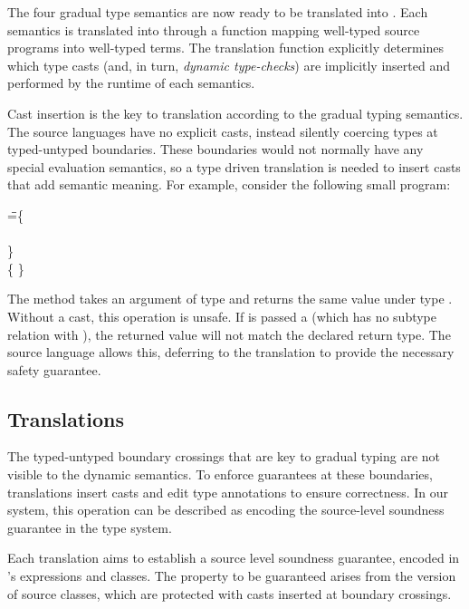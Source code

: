 \documentclass[USenglish]{tex/lipics-v2016}
\begin{document}

\noindent The four gradual type semantics are now ready to be translated into
\kafka. Each semantics is translated into \kafka through a function mapping
well-typed source programs into well-typed \kafka terms. The translation
function explicitly determines which type casts (and, in turn, \emph{dynamic
type-checks}) are implicitly inserted and performed by the runtime of each
semantics.

Cast insertion is the key to translation according to the gradual typing
semantics. The source languages have no explicit casts, instead silently
coercing types at typed-untyped boundaries. These boundaries would not
normally have any special evaluation semantics, so a type driven translation
is needed to insert casts that add semantic meaning. For example, consider the
following small program:

\begin{tabbing}
\hspace{1cm}\K\HS \Call{\New\C{}}\m{\New\D{}} \HS\HS\HS\WHERE\HS
  \K\HS =\HS \= \class\= \C \{\\
       \> \HS \Mdef\m\x\any\C{\HS\x\HS}\\
       \> \}  \\
       \>\class \D \{ \}
\end{tabbing}         

\noindent The method \m takes an argument of type \any and returns the same
value under type \C. Without a cast, this operation is unsafe. If \m is passed
a \D (which has no subtype relation with \C), the returned value will not
match the declared return type. The source language allows this, deferring to
the translation to provide the necessary safety guarantee. 


\subsection{Translations}

The typed-untyped boundary crossings that are key to gradual typing are not
visible to the dynamic semantics. To enforce guarantees at these boundaries,
translations insert casts and edit type annotations to ensure correctness. In
our system, this operation can be described as encoding the source-level
soundness guarantee in the \kafka type system.

Each translation aims to establish a source level soundness guarantee, encoded
in \kafka's expressions and classes.  The property to be guaranteed arises from
the \kafka version of source classes, which are protected with \kafka casts
inserted at boundary crossings.
\end{document}
